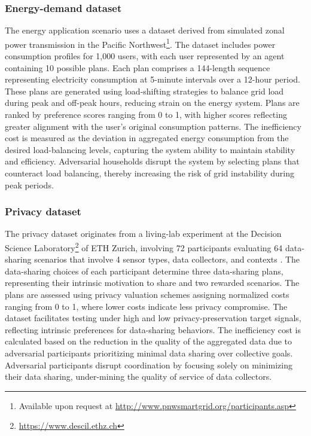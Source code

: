 \documentclass[journal]{IEEEtran}
\begin{document}
\subsubsection{Energy-demand dataset}
The energy application scenario uses a dataset derived from simulated zonal power transmission in the Pacific Northwest\footnote{Available upon request at \url{http://www.pnwsmartgrid.org/participants.asp}}. The dataset includes power consumption profiles for 1,000 users, with each user represented by an agent containing 10 possible plans. Each plan comprises a 144-length sequence representing electricity consumption at 5-minute intervals over a 12-hour period. These plans are generated using load-shifting strategies to balance grid load during peak and off-peak hours, reducing strain on the energy system. Plans are ranked by preference scores ranging from 0 to 1, with higher scores reflecting greater alignment with the user's original consumption patterns. 
The inefficiency cost is measured as the deviation in aggregated energy consumption from the desired load-balancing levels, capturing the system ability to maintain stability and efficiency. Adversarial households disrupt the system by selecting plans that counteract load balancing, thereby increasing the risk of grid instability during peak periods.

\subsubsection{Privacy dataset}
The privacy dataset originates from a living-lab experiment at the Decision Science Laboratory\footnote{\url{https://www.descil.ethz.ch}} of ETH Zurich, involving 72 participants evaluating 64 data-sharing scenarios that involve 4 sensor types, data collectors, and contexts \cite{pournaras2024collective}. The data-sharing choices of each participant determine three data-sharing plans, representing their intrinsic motivation to share and two rewarded scenarios. The plans are assessed using privacy valuation schemes assigning normalized costs ranging from 0 to 1, where lower costs indicate less privacy compromise. The dataset facilitates testing under high and low privacy-preservation target signals, reflecting intrinsic preferences for data-sharing behaviors. The inefficiency cost is calculated based on the reduction in the quality of the aggregated data due to adversarial participants prioritizing minimal data sharing over collective goals. Adversarial participants disrupt coordination by focusing solely on minimizing their data sharing, under-mining the quality of service of data collectors.
\end{document}

